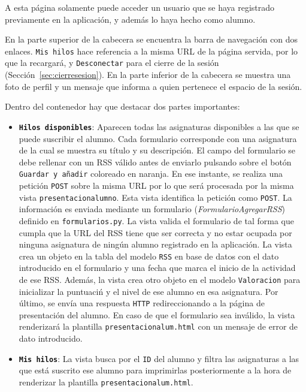 \documentclass[a4paper, 12pt]{book}
\begin{document}
A esta p\'agina solamente puede acceder un usuario que se haya registrado previamente en la aplicaci\'on, y adem\'as lo haya hecho como alumno.

En la parte superior de la cabecera se encuentra la barra de navegaci\'on con dos enlaces. \texttt{Mis hilos} hace referencia a la misma URL de la 
p\'agina servida, por lo que la recargar\'a, y \texttt{Desconectar} para el cierre de la sesi\'on (Secci\'on~\ref{sec:cierresesion}). En la parte inferior 
de la cabecera se muestra una foto de perfil y un mensaje que informa a quien pertenece el espacio de la sesi\'on.

Dentro del contenedor hay que destacar dos partes importantes:
\begin{itemize}
  \item {\bfseries \texttt{Hilos disponibles}}: Aparecen todas las asignaturas disponibles a las que se puede suscribir el alumno. Cada formulario 
  corresponde con una asignatura de la cual se muestra su t\'itulo y su descripci\'on. El campo del formulario se debe rellenar con un RSS v\'alido antes 
  de enviarlo pulsando sobre el bot\'on \texttt{Guardar y a\~nadir} coloreado en naranja. En ese instante, se realiza una petici\'on 
  \texttt{POST} sobre la misma URL por lo que ser\'a procesada por la misma vista \texttt{presentacionalumno}. Esta vista identifica la petici\'on como 
  \texttt{POST}. La informaci\'on es enviada mediante un formulario (\textit{FormularioAgregarRSS}) definido en \texttt{formularios.py}. La vista valida 
  el formulario de tal forma que cumpla que la URL del RSS tiene que ser correcta y no estar ocupada por ninguna asignatura de ning\'un alumno registrado 
  en la aplicaci\'on. La vista crea un objeto en la tabla del modelo \texttt{RSS} en base de datos con el dato introducido en el formulario y una fecha que 
  marca el inicio de la actividad de ese RSS. Adem\'as, la vista crea otro objeto en el modelo \texttt{Valoracion} para inicializar la puntuaci\'n y el 
  nivel de ese alumno en esa asignatura. Por \'ultimo, se env\'ia una respuesta \texttt{HTTP} redireccionando a la p\'agina de presentaci\'on del alumno. 
  En caso de que el formulario sea inv\'alido, la vista renderizar\'a la plantilla \texttt{presentacionalum.html} con un mensaje de error de dato 
  introducido.
  \item {\bfseries \texttt{Mis hilos}}: La vista busca por el \texttt{ID} del alumno y filtra las asignaturas a las que est\'a suscrito ese alumno para 
  imprimirlas posteriormente a la hora de renderizar la plantilla \texttt{presentacionalum.html}.
\end{itemize}
\end{document}
